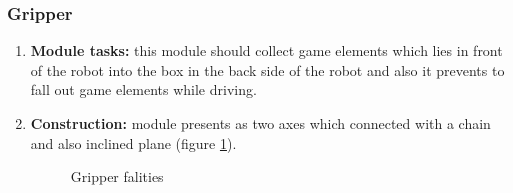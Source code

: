 \subsubsection{Gripper}

\begin{enumerate}
  \item 
	\textbf{Module tasks:}
	  this module should collect game elements which lies in front of the robot into the box in the back side of the robot and also it prevents to fall out game elements while driving.
  \item 
	\textbf{Construction:} 
	  module presents as two axes which connected with a chain and also inclined plane (figure \ref{Gripper500}).
	  \begin{figure}[H]
	  	\begin{minipage}[h]{1\linewidth}
	  		\caption{Gripper falities}
	  		\label{Gripper500}
	  	\end{minipage}
	  \end{figure}
	  

\end{enumerate}
